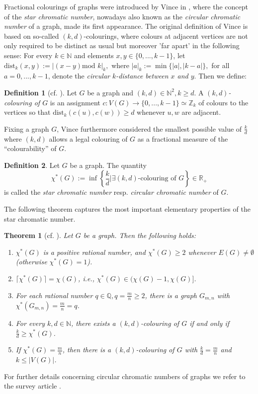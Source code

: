 \documentclass[fontsize=11pt,a4paper,DIV12]{scrartcl}
\theoremstyle{meiner}
\newtheorem{theorem}{Theorem}
\theoremstyle{definition}
\newtheorem{definition}{Definition}
\begin{document}
Fractional colourings of graphs were introduced by Vince in
\cite{vince}, where the concept of the \emph{star chromatic number},
nowadays also known as the \emph{circular chromatic number} of a
graph, made its first appearance. The original definition of Vince is
based on so-called $(k,d)$-colourings, where colours at adjacent
vertices are not only required to be distinct as usual but moreover
'far apart' in the following sense: For every $k \in \mathbb{N}$ and
elements $x,y \in \{0,...,k-1\}$, let $\text{dist}_k(x,y):=|(x-y)
\text{mod } k|_k,$ where $|a|_k:=\min\{|a|,|k-a|\},$ for all
$a=0,...,k-1$, denote the {\em circular $k$-distance between $x$ and
  $y$}. Then we define:

\begin{definition}[cf. \cite{vince}]
  Let $G$ be a graph and $(k,d) \in \mathbb{N}^2, k \ge d$. A
  {\em $(k,d)$-colouring of $G$} is an assignment $c:V(G)
  \rightarrow \{0,...,k-1\} \simeq \mathbb{Z}_k$ of colours to the
  vertices so that $\text{dist}_k(c(u),c(w)) \ge d$ whenever $u,w$ are
  adjacent.
\end{definition}
Fixing a graph $G$, Vince furthermore considered the smallest possible value of $\frac{k}{d}$ where $(k,d)$ allows a legal colouring of $G$ as a fractional measure of the ``colourability'' of $G$.
\begin{definition}
Let $G$ be a graph. The quantity 
$$\chi^\ast(G):=\inf\left\{\frac{k}{d}\bigg\vert\exists (k,d) \text{-colouring of }G\right\} \in \mathbb{R}_+$$
is called the \emph{star chromatic number} resp. \emph{circular chromatic number} of $G$.
\end{definition}
The following theorem captures the most important elementary properties of the star chromatic number.
\begin{theorem}[cf. \cite{vince}] \label{FracPropUndir}
Let $G$ be a graph. Then the following holds:
\begin{enumerate}
\item[(i)] $\chi^\ast(G)$ is a positive rational number, and $\chi^\ast(G) \ge 2$ whenever $E(G) \neq \emptyset$ (otherwise $\chi^\ast(G)=1$). 
\item[(ii)] $\lceil \chi^\ast(G) \rceil=\chi(G)$, i.e., $\chi^\ast(G) \in (\chi(G)-1,\chi(G)]$.
\item[(iii)] For each rational number $q \in \mathbb{Q}, q=\frac{m}{n} \ge 2$, there is a graph $G_{m,n}$ with $\chi^\ast(G_{m,n})=\frac{m}{n}=q$.
\item[(iv)] For every $k,d \in \mathbb{N}$, there exists a $(k,d)$-colouring of $G$ if and only if $\frac{k}{d} \ge \chi^\ast(G)$.
\item[(v)] If $\chi^\ast(G)=\frac{m}{n}$, then there is a $(k,d)$-colouring of $G$ with $\frac{k}{d}=\frac{m}{n}$ and $k \leq |V(G)|$.
\end{enumerate}
\end{theorem}
For further details concerning circular chromatic numbers of graphs we
refer to the survey article \cite{xuding}.  
\end{document}
